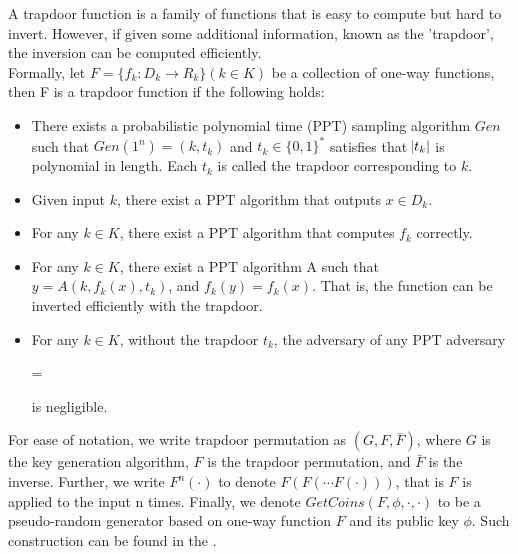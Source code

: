 \begin{definition}
	A trapdoor function is a family of functions that is easy to compute but hard to invert. However, if given some additional information, known as the 'trapdoor', the inversion can be computed efficiently. \\
	Formally, let $F = \{f_k : D_k \rightarrow R_k\} (k \in K)$ be a collection of one-way functions, then F is a trapdoor function if the following holds:
	\begin{itemize}
		\item
		There exists a probabilistic polynomial time (PPT) sampling algorithm $Gen$ such that $Gen(1^n) = (k, t_k)$ and $t_k \in \{0,1\}^*$ satisfies that $\abs{t_k}$ is polynomial in length. Each $t_k$ is called the trapdoor corresponding to $k$.
		\item
		Given input $k$, there exist a PPT algorithm that outputs $x \in  D_k$.
		\item
		For any $k \in K$, there exist a PPT algorithm that computes $f_k$ correctly.
		\item
		For any $k \in K$, there exist a PPT algorithm A such that $y = A(k, f_k(x), t_k)$, and $f_k(y) = f_k(x)$. That is, the function can be inverted efficiently with the trapdoor.
		\item
		For any $k \in K$, without the trapdoor $t_k$, the adversary of any PPT adversary
		\begin{center}
			 = 
		\end{center}
		is negligible.
	\end{itemize} 
\end{definition}

For ease of notation, we write trapdoor permutation as $(G, F, \bar{F})$, where $G$ is the key generation algorithm, $F$ is the trapdoor permutation, and $\bar{F}$ is the inverse. Further, we write $F^n(\cdot)$ to denote $F(F(\cdots F(\cdot)))$, that is $F$ is applied to the input n times. Finally, we denote $GetCoins(F, \phi, \cdot, \cdot)$ to be a pseudo-random generator based on one-way function $F$ and its public key $\phi$. Such construction can be found in the \cite{doi:10.1137/0213053, 4568378, Goldreich:1989:HPO:73007.73010}.

